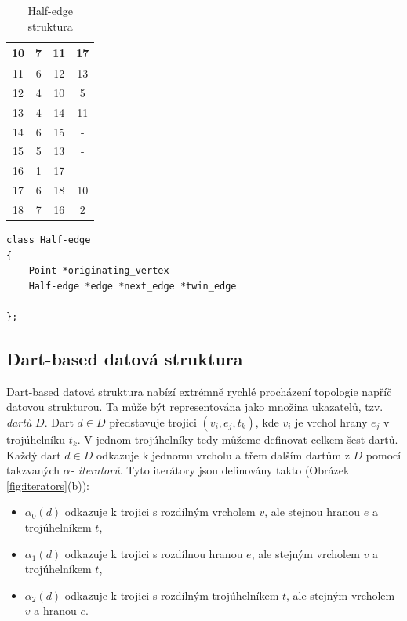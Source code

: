 \documentclass[12pt,a4paper]{article}
\begin{document}
\begin{table}[h!]
\begin{tabular}{|c||c||c|c|}
10                         & 7                                 & 11                         & 17        \\ \hline
11                         & 6                                 & 12                         & 13        \\ \hline
12                         & 4                                 & 10                         & 5         \\ \hline
13                         & 4                                 & 14                         & 11        \\ \hline
14                         & 6                                 & 15                         & -         \\ \hline
15                         & 5                                 & 13                         & -         \\ \hline
16                         & 1                                 & 17                         & -         \\ \hline
17                         & 6                                 & 18                         & 10        \\ \hline
18                         & 7                                 & 16                         & 2         \\ \hline
\end{tabular}
\caption{Half-edge struktura}
\label{tab:half_edge}
\end{table}

\newpage
\begin{lstlisting}[caption={Definice datové struktury}]
class Half-edge
{
	Point *originating_vertex
	Half-edge *edge *next_edge *twin_edge
	
};
\end{lstlisting}

\subsection{Dart-based datová struktura}
Dart-based datová struktura nabízí extrémně rychlé procházení topologie napříč datovou strukturou. Ta může být representována jako množina ukazatelů, tzv. \emph{dartů} $D$. Dart $d \in D$ představuje trojici $(v_i, e_j, t_k)$, kde $v_i$ je vrchol hrany $e_j$ v trojúhelníku $t_k$. V jednom trojúhelníky tedy můžeme definovat celkem šest dartů. Každý dart $d \in D$ odkazuje k jednomu vrcholu a třem dalším dartům z $D$ pomocí takzvaných $\alpha$\emph{- iteratorů}. Tyto iterátory jsou definovány takto (Obrázek \ref{fig:iterators}(b)):
\begin{itemize}
\item $\alpha_0(d)$ odkazuje k trojici s rozdílným vrcholem $v$, ale stejnou hranou $e$ a trojúhelníkem $t$,
\item $\alpha_1(d)$ odkazuje k trojici s rozdílnou hranou $e$, ale stejným vrcholem $v$ a trojúhelníkem $t$,
\item $\alpha_2(d)$ odkazuje k trojici s rozdílným trojúhelníkem $t$, ale stejným vrcholem $v$ a hranou $e$.
\end{itemize}
\end{document}
